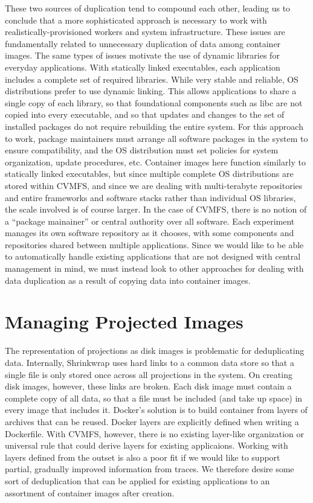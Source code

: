\documentclass[sigconf]{acmart}
\begin{document}
These two sources of duplication tend to compound each other,
leading us to conclude that a more sophisticated approach is necessary to work with realistically-provisioned workers and system infrastructure.
These issues are fundamentally related to unnecessary duplication of data among container images.
The same types of issues motivate the use of dynamic libraries for everyday applications.
With statically linked executables,
each application includes a complete set of required libraries.
While very stable and reliable,
OS distributions prefer to use dynamic linking.
This allows applications to share a single copy of each library,
so that foundational components such as libc are not copied into every executable,
and so that updates and changes to the set of installed packages do not require rebuilding the entire system.
For this approach to work,
package maintainers must arrange all software packages in the system to ensure compatibility,
and the OS distribution must set policies for system organization, update procedures, etc.
Container images here function similarly to statically linked executables,
but since multiple complete OS distributions are stored within CVMFS,
and since we are dealing with multi-terabyte repositories and entire frameworks and software stacks rather than individual OS libraries,
the scale involved is of course larger.
In the case of CVMFS, there is no notion of a ``package mainainer'' or central authority over all software.
Each experiment manages its own software repository as it chooses,
with some components and repositories shared between multiple applications.
Since we would like to be able to automatically handle existing applications that are not designed with central management in mind,
we must instead look to other approaches for dealing with data duplication as a result of copying data into container images.

\section{Managing Projected Images}

The representation of projections as disk images is problematic for deduplicating data.
Internally, Shrinkwrap uses hard links to a common data store so that a single file is only stored once across all projections in the system.
On creating disk images, however,
these links are broken.
Each disk image must contain a complete copy of all data,
so that a file must be included (and take up space) in every image that includes it.
Docker's solution is to build container from layers of archives that can be reused.
Docker layers are explicitly defined when writing a Dockerfile.
With CVMFS, however, there is no existing layer-like organization or universal rule that could derive layers for existing applicaions.
Working with layers defined from the outset is also a poor fit if we would like to support partial, gradually improved information from traces.
We therefore desire some sort of deduplication that can be applied for existing applications to an assortment of container images after creation.
\end{document}
